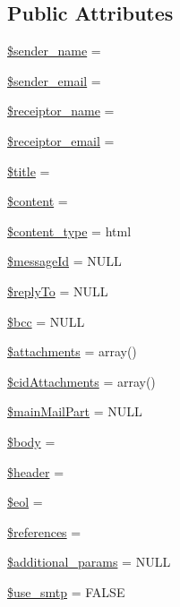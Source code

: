 \subsection*{Public Attributes}
\begin{DoxyCompactItemize}
\item 
\hyperlink{classMail_a0ad6aa18dc8ea8c632bb7a82175e8d68}{\$sender\+\_\+name} = \textquotesingle{}\textquotesingle{}
\item 
\hyperlink{classMail_a94dccbbdc161e818d90e41ad197ebe85}{\$sender\+\_\+email} = \textquotesingle{}\textquotesingle{}
\item 
\hyperlink{classMail_a44df4937f3c8b2691e9bbb1220c667f3}{\$receiptor\+\_\+name} = \textquotesingle{}\textquotesingle{}
\item 
\hyperlink{classMail_aa034785886f8bdcf3a5ed9c86ce8ed14}{\$receiptor\+\_\+email} = \textquotesingle{}\textquotesingle{}
\item 
\hyperlink{classMail_aea1a8697c961d49a688564c5ca16cbcb}{\$title} = \textquotesingle{}\textquotesingle{}
\item 
\hyperlink{classMail_a5a3320973718a2ca8a3fe798bf79c624}{\$content} = \textquotesingle{}\textquotesingle{}
\item 
\hyperlink{classMail_ac933733b17efbb4978a46e557d32c440}{\$content\+\_\+type} = \textquotesingle{}html\textquotesingle{}
\item 
\hyperlink{classMail_a48caf58883e736f50ab87a03147c584a}{\$message\+Id} = N\+U\+L\+L
\item 
\hyperlink{classMail_a55788852017ccc1716af69cdde26df99}{\$reply\+To} = N\+U\+L\+L
\item 
\hyperlink{classMail_a2e25b3c43459422d40765d581b165692}{\$bcc} = N\+U\+L\+L
\item 
\hyperlink{classMail_a93b05b1003cc8ea16b59c00d77f47466}{\$attachments} = array()
\item 
\hyperlink{classMail_a66c6752b550e4e8fd79a63b62815f48f}{\$cid\+Attachments} = array()
\item 
\hyperlink{classMail_ad58544ae1c34119ec852e3c22b855624}{\$main\+Mail\+Part} = N\+U\+L\+L
\item 
\hyperlink{classMail_acbd542849121b33a76ed63e1c4670e02}{\$body} = \textquotesingle{}\textquotesingle{}
\item 
\hyperlink{classMail_ace98431d0944d23544743094b443d506}{\$header} = \textquotesingle{}\textquotesingle{}
\item 
\hyperlink{classMail_acaebf19cba0b8be83989e241c96f9eb7}{\$eol} = \textquotesingle{}\textquotesingle{}
\item 
\hyperlink{classMail_abcd438320caac44b166df90ba9092fe9}{\$references} = \textquotesingle{}\textquotesingle{}
\item 
\hyperlink{classMail_a38466de017089677f088c9a4025f724f}{\$additional\+\_\+params} = N\+U\+L\+L
\item 
\hyperlink{classMail_a8fe39b2063dc112d7db67be074142628}{\$use\+\_\+smtp} = F\+A\+L\+S\+E
\end{DoxyCompactItemize}


